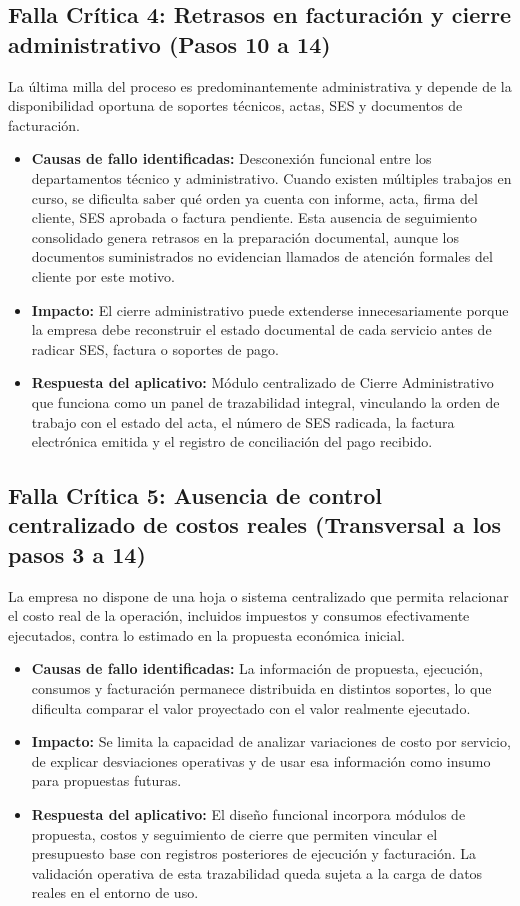 \subsection{Falla Crítica 4: Retrasos en facturación y cierre administrativo (Pasos 10 a 14)}
La última milla del proceso es predominantemente administrativa y depende de la disponibilidad oportuna de soportes técnicos, actas, SES y documentos de facturación.
\begin{itemize}
    \item \textbf{Causas de fallo identificadas:} Desconexión funcional entre los departamentos técnico y administrativo. Cuando existen múltiples trabajos en curso, se dificulta saber qué orden ya cuenta con informe, acta, firma del cliente, SES aprobada o factura pendiente. Esta ausencia de seguimiento consolidado genera retrasos en la preparación documental, aunque los documentos suministrados no evidencian llamados de atención formales del cliente por este motivo.
    \item \textbf{Impacto:} El cierre administrativo puede extenderse innecesariamente porque la empresa debe reconstruir el estado documental de cada servicio antes de radicar SES, factura o soportes de pago.
    \item \textbf{Respuesta del aplicativo:} Módulo centralizado de Cierre Administrativo que funciona como un panel de trazabilidad integral, vinculando la orden de trabajo con el estado del acta, el número de SES radicada, la factura electrónica emitida y el registro de conciliación del pago recibido.
\end{itemize}

\subsection{Falla Crítica 5: Ausencia de control centralizado de costos reales (Transversal a los pasos 3 a 14)}
La empresa no dispone de una hoja o sistema centralizado que permita relacionar el costo real de la operación, incluidos impuestos y consumos efectivamente ejecutados, contra lo estimado en la propuesta económica inicial.
\begin{itemize}
    \item \textbf{Causas de fallo identificadas:} La información de propuesta, ejecución, consumos y facturación permanece distribuida en distintos soportes, lo que dificulta comparar el valor proyectado con el valor realmente ejecutado.
    \item \textbf{Impacto:} Se limita la capacidad de analizar variaciones de costo por servicio, de explicar desviaciones operativas y de usar esa información como insumo para propuestas futuras.
    \item \textbf{Respuesta del aplicativo:} El diseño funcional incorpora módulos de propuesta, costos y seguimiento de cierre que permiten vincular el presupuesto base con registros posteriores de ejecución y facturación. La validación operativa de esta trazabilidad queda sujeta a la carga de datos reales en el entorno de uso.
\end{itemize}

